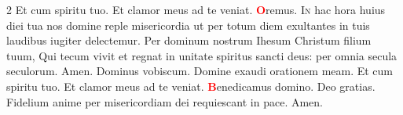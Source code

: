 \begin{multicols}{2}
\newline \R Et cum spiritu tuo.  Et clamor meus ad te veniat.
\newline \textcolor{Red}{\bfseries O}remus. 
\lettrine[lines=2]{\zallmancaps \color{Red} I}{n} \hypertarget{in-hac-hora}{\label{in-hac-hora}} hac hora huius diei tua nos domine reple misericordia ut per totum diem exultantes in tuis laudibus iugiter delectemur. Per dominum nostrum Ihesum Christum filium tuum, Qui tecum vivit et regnat in unitate spiritus sancti deus: per omnia secula seculorum. \R Amen.
\newline {} Dominus vobiscum.  Domine exaudi orationem meam.
\newline \R Et cum spiritu tuo.  Et clamor meus ad te veniat.
\newline \textcolor{Red}{\bfseries B}enedicamus domino. \R Deo gratias.
\newline {}
\newline Fidelium anime per misericordiam dei requiescant in pace. \R Amen.
\newline {}




\end{multicols}
